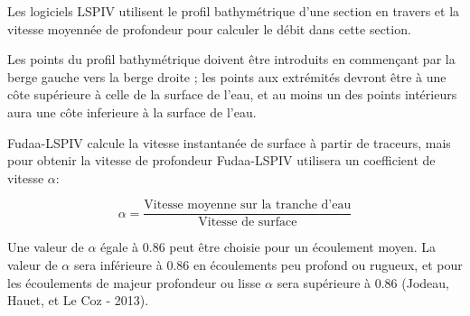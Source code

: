 \documentclass[
]{article}
\begin{document}
Les logiciels LSPIV utilisent le profil bathymétrique d'une section en travers et la vitesse moyennée de profondeur pour calculer le débit dans cette section.

Les points du profil bathymétrique doivent être introduits en commençant par la berge gauche vers la berge droite ; les points aux extrémités devront être à une côte supérieure à celle de la surface de l'eau, et au moins un des points intérieurs aura une côte inferieure à la surface de l'eau.

Fudaa-LSPIV calcule la vitesse instantanée de surface à partir de traceurs, mais pour obtenir la vitesse de profondeur Fudaa-LSPIV utilisera un coefficient de vitesse \(\alpha\):

\begin{equation}
\alpha =  \frac{\text{Vitesse moyenne sur la tranche d'eau}}{\text{Vitesse de surface}}
\end{equation}

Une valeur de \(\alpha\) égale à 0.86 peut être choisie pour un écoulement moyen. La valeur de \(\alpha\) sera inférieure à 0.86 en écoulements peu profond ou rugueux, et pour les écoulements de majeur profondeur ou lisse \(\alpha\) sera supérieure à 0.86 (Jodeau, Hauet, et Le Coz - 2013). \citep{hauet_application_2013}

\newpage

  
\end{document}

